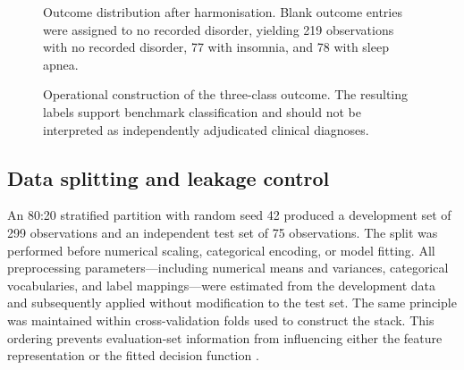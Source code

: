 ﻿\documentclass[preprint,12pt]{elsarticle}
\begin{document}
\begin{figure}[t]
\centering
{}
\caption{Outcome distribution after harmonisation. Blank outcome entries were assigned to no recorded disorder, yielding 219 observations with no recorded disorder, 77 with insomnia, and 78 with sleep apnea.}
\label{fig:distribution}
\end{figure}

\begin{figure}[t]
\centering
{}
\caption{Operational construction of the three-class outcome. The resulting labels support benchmark classification and should not be interpreted as independently adjudicated clinical diagnoses.}
\label{fig:target}
\end{figure}

\FloatBarrier

\subsection{Data splitting and leakage control}
An 80:20 stratified partition with random seed 42 produced a development set of 299 observations and an independent test set of 75 observations. The split was performed before numerical scaling, categorical encoding, or model fitting. All preprocessing parameters---including numerical means and variances, categorical vocabularies, and label mappings---were estimated from the development data and subsequently applied without modification to the test set. The same principle was maintained within cross-validation folds used to construct the stack. This ordering prevents evaluation-set information from influencing either the feature representation or the fitted decision function \cite{kapoor2023,efthimiou2024}.
\end{document}
